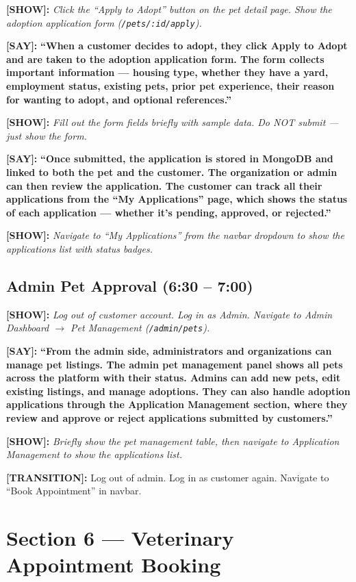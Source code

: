 \documentclass[12pt,a4paper]{article}
\newcommand{\say}[1]{\textbf{\textcolor{narration}{[SAY]:}} \textbf{``#1''}}
\newcommand{\show}[1]{\textbf{\textcolor{screen}{[SHOW]:}} \textit{#1}}
\newcommand{\trans}[1]{\textbf{\textcolor{transition}{[TRANSITION]:}} #1}
\begin{document}
\show{Click the ``Apply to Adopt'' button on the pet detail page. Show the adoption application form (\texttt{/pets/:id/apply}).}

\say{When a customer decides to adopt, they click Apply to Adopt and are taken to the adoption application form. The form collects important information --- housing type, whether they have a yard, employment status, existing pets, prior pet experience, their reason for wanting to adopt, and optional references.}

\show{Fill out the form fields briefly with sample data. Do NOT submit --- just show the form.}

\say{Once submitted, the application is stored in MongoDB and linked to both the pet and the customer. The organization or admin can then review the application. The customer can track all their applications from the ``My Applications'' page, which shows the status of each application --- whether it's pending, approved, or rejected.}

\show{Navigate to ``My Applications'' from the navbar dropdown to show the applications list with status badges.}

\subsection{Admin Pet Approval (6:30 -- 7:00)}

\show{Log out of customer account. Log in as Admin. Navigate to Admin Dashboard $\rightarrow$ Pet Management (\texttt{/admin/pets}).}

\say{From the admin side, administrators and organizations can manage pet listings. The admin pet management panel shows all pets across the platform with their status. Admins can add new pets, edit existing listings, and manage adoptions. They can also handle adoption applications through the Application Management section, where they review and approve or reject applications submitted by customers.}

\show{Briefly show the pet management table, then navigate to Application Management to show the applications list.}

\trans{Log out of admin. Log in as customer again. Navigate to ``Book Appointment'' in navbar.}

\newpage

\section{Section 6 --- Veterinary Appointment Booking}
\label{sec:appointments}
\end{document}
